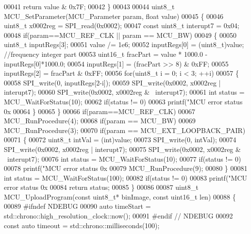 \begin{DoxyCode}
00041     \textcolor{keywordflow}{return} value & 0x7F;
00042 \}
00043 
00044 uint8\_t MCU_SetParameter(MCU_Parameter param, \textcolor{keywordtype}{float} value)
00045 \{
00046     uint8\_t x0002reg = SPI_read(0x0002);
00047     \textcolor{keyword}{const} uint8\_t interupt7 = 0x04;
00048     \textcolor{keywordflow}{if}(param==MCU_REF_CLK || param == MCU_BW)
00049     \{
00050         uint8\_t inputRegs[3];
00051         value /= 1e6;
00052         inputRegs[0] = (uint8\_t)value; \textcolor{comment}{//frequency integer part}
00053         uint16\_t fracPart = value * 1000.0 - inputRegs[0]*1000.0;
00054         inputRegs[1] = (fracPart >> 8) & 0xFF;
00055         inputRegs[2] = fracPart & 0xFF;
00056         \textcolor{keywordflow}{for}(uint8\_t i = 0; i < 3; ++i)
00057         \{
00058             SPI_write(0, inputRegs[2-i]);
00059             SPI_write(0x0002, x0002reg | interupt7);
00060             SPI_write(0x0002, x0002reg & ~interupt7);
00061             \textcolor{keywordtype}{int} status = MCU_WaitForStatus(10);
00062             \textcolor{keywordflow}{if}(status != 0)
00063                 printf(\textcolor{stringliteral}{"MCU error status 0x%
00064         \}
00065     \}
00066     \textcolor{keywordflow}{if}(param==MCU_REF_CLK)
00067         MCU_RunProcedure(4);
00068     \textcolor{keywordflow}{if}(param == MCU_BW)
00069         MCU_RunProcedure(3);
00070     \textcolor{keywordflow}{if}(param == MCU_EXT_LOOPBACK_PAIR)
00071     \{
00072         uint8\_t intVal = (int)value;
00073         SPI_write(0, intVal);
00074         SPI_write(0x0002, x0002reg | interupt7);
00075         SPI_write(0x0002, x0002reg & ~interupt7);
00076         \textcolor{keywordtype}{int} status = MCU_WaitForStatus(10);
00077         \textcolor{keywordflow}{if}(status != 0)
00078             printf(\textcolor{stringliteral}{"MCU error status 0x%
00079         MCU_RunProcedure(9);
00080     \}
00081     \textcolor{keywordtype}{int} status = MCU_WaitForStatus(100);
00082     \textcolor{keywordflow}{if}(status != 0)
00083             printf(\textcolor{stringliteral}{"MCU error status 0x%
00084     \textcolor{keywordflow}{return} status;
00085 \}
00086 
00087 uint8\_t MCU_UploadProgram(\textcolor{keyword}{const} uint8\_t* binImage, \textcolor{keyword}{const} uint16\_t len)
00088 \{
00089 \textcolor{preprocessor}{#ifndef NDEBUG}
00090     \textcolor{keyword}{auto} timeStart = std::chrono::high\_resolution\_clock::now();
00091 \textcolor{preprocessor}{#endif // NDEBUG}
00092     \textcolor{keyword}{const} \textcolor{keyword}{auto} timeout = std::chrono::milliseconds(100);
}}}
\end{DoxyCode}
